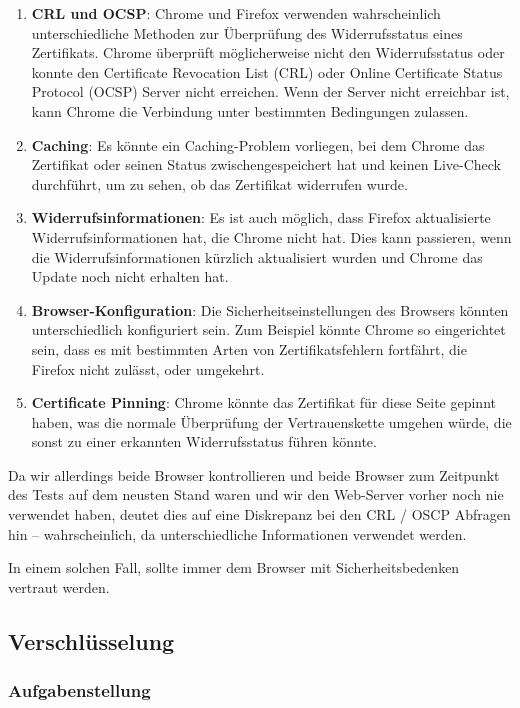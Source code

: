 \documentclass{article}
\begin{document}
\begin{enumerate}
  \item \textbf{CRL und OCSP}: Chrome und Firefox verwenden wahrscheinlich unterschiedliche Methoden zur Überprüfung des Widerrufsstatus eines Zertifikats. Chrome überprüft möglicherweise nicht den Widerrufsstatus oder konnte den Certificate Revocation List (CRL) oder Online Certificate Status Protocol (OCSP) Server nicht erreichen. Wenn der Server nicht erreichbar ist, kann Chrome die Verbindung unter bestimmten Bedingungen zulassen.
  \item \textbf{Caching}: Es könnte ein Caching-Problem vorliegen, bei dem Chrome das Zertifikat oder seinen Status zwischengespeichert hat und keinen Live-Check durchführt, um zu sehen, ob das Zertifikat widerrufen wurde.
  \item \textbf{Widerrufsinformationen}: Es ist auch möglich, dass Firefox aktualisierte Widerrufsinformationen hat, die Chrome nicht hat. Dies kann passieren, wenn die Widerrufsinformationen kürzlich aktualisiert wurden und Chrome das Update noch nicht erhalten hat.
  \item \textbf{Browser-Konfiguration}: Die Sicherheitseinstellungen des Browsers könnten unterschiedlich konfiguriert sein. Zum Beispiel könnte Chrome so eingerichtet sein, dass es mit bestimmten Arten von Zertifikatsfehlern fortfährt, die Firefox nicht zulässt, oder umgekehrt.
  \item \textbf{Certificate Pinning}: Chrome könnte das Zertifikat für diese Seite gepinnt haben, was die normale Überprüfung der Vertrauenskette umgehen würde, die sonst zu einer erkannten Widerrufsstatus führen könnte.
\end{enumerate}

Da wir allerdings beide Browser kontrollieren und beide Browser zum Zeitpunkt des Tests auf dem neusten Stand waren und wir den Web-Server vorher noch nie
verwendet haben, deutet dies auf eine Diskrepanz bei den CRL / OSCP Abfragen hin – wahrscheinlich, da unterschiedliche Informationen verwendet werden.

In einem solchen Fall, sollte immer dem Browser mit Sicherheitsbedenken vertraut werden.

\newpage

\subsection{Verschlüsselung}

\subsubsection*{Aufgabenstellung}
\end{document}
